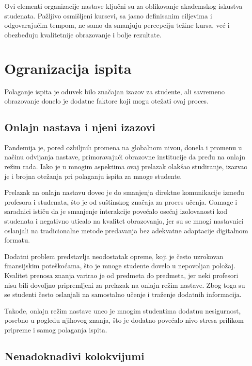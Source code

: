 \documentclass[a4paper]{article}
\begin{document}
Ovi elementi organizacije nastave ključni su za oblikovanje akademskog iskustva studenata.
Pažljivo osmišljeni kursevi, sa jasno definisanim ciljevima i odgovarajućim tempom, ne samo
da smanjuju percepciju težine kursa, već i obezbeđuju kvalitetnije obrazovanje i bolje
rezultate.

\section{Ogranizacija ispita}

Polaganje ispita je oduvek bilo značajan izazov za studente, ali savremeno obrazovanje donelo je dodatne faktore koji mogu otežati ovaj proces.

\subsection{Onlajn nastava i njeni izazovi}

Pandemija je, pored ozbiljnih promena na globalnom nivou, donela i promenu u načinu odvijanja nastave, primoravajući obrazovne institucije da pređu na onlajn režim rada. Iako je u mnogim aspektima ovaj prelazak olakšao studiranje, izazvao je i brojna otežanja pri polaganju ispita za mnoge studente.

Prelazak na onlajn nastavu doveo je do smanjenja direktne komunikacije između profesora i studenata, što je od suštinskog značaja za proces učenja. Gamage i saradnici \cite{gamage2022rethinking} ističu da je smanjenje interakcije povećalo osećaj izolovanosti kod studenata i negativno uticalo na kvalitet obrazovanja, jer su se mnogi nastavnici oslanjali na tradicionalne metode predavanja bez adekvatne adaptacije digitalnom formatu.

Dodatni problem predstavlja neodostatak opreme, koji je često uzrokovan finansijskim poteškoćama, što je mnoge studente dovelo u nepovoljan položaj. Kvalitet prenosa znanja varirao je od predmeta do predmeta, jer neki profesori nisu bili dovoljno pripremljeni za prelazak na onlajn režim nastave. Zbog toga su se studenti često oslanjali na samostalno učenje i traženje dodatnih informacija.

Takođe, onlajn režim nastave uneo je mnogim studentima dodatnu nesigurnost, posebno u pogledu njihovog znanja, što je dodatno povećalo nivo stresa prilikom pripreme i samog polaganja ispita.

\subsection{Nenadoknadivi kolokvijumi}
\end{document}
